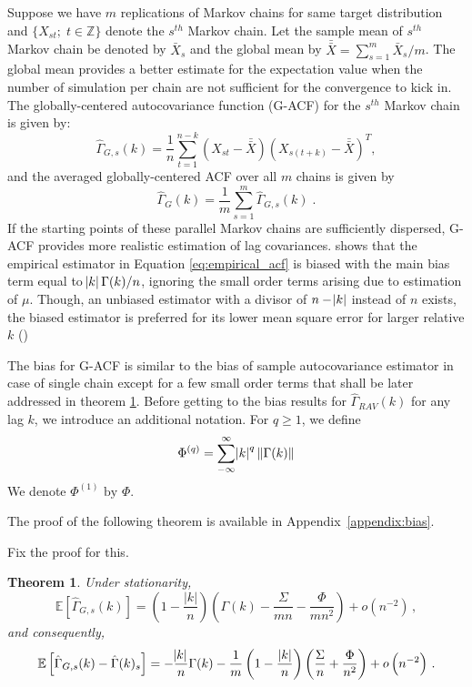 \documentclass[11pt]{article}
\newtheorem{theorem}{Theorem}
\theoremstyle{remark}
\begin{document}
 Suppose we have $m$ replications of Markov chains for same target distribution and $\{X_{st}; \; t \in \mathbb{Z}\}$ denote the $s^{th}$ Markov chain. Let the sample mean of $s^{th}$ Markov chain be denoted by $\bar{X}_s$ and the global mean by $\bar{\bar{X}} = \sum_{s = 1}^{m}\bar{X}_s/m$. The global mean provides a better estimate for the expectation value when the number of simulation per chain are not sufficient for the convergence to kick in. The globally-centered autocovariance function (G-ACF) for the $s^{th}$ Markov chain is given by:
%
\[
\hat{\Gamma}_{G,s}(k) = \dfrac{1}{n} \sum_{t=1}^{n-k}(X_{st}-\bar{\bar{X}})(X_{s(t+k)}-\bar{\bar{X}})^T,
\]
and the averaged globally-centered ACF over all $m$ chains is given by 
\[
\hat{\Gamma}_G(k) = \dfrac{1}{m}\sum_{s=1}^m \hat{\Gamma}_{G,s}(k)\;.
\]
If the starting points of these parallel Markov chains are sufficiently dispersed, G-ACF provides more realistic estimation of lag covariances. \cite{priestley1981spectral} shows that the empirical estimator in Equation \ref{eq:empirical_acf} is biased with the main bias term equal to $\abs{k}\Gamma(k)/n$, ignoring the small order terms arising due to estimation of $\mu$. Though, an unbiased estimator with a divisor of $n - \abs{k}$ instead of $n$ exists, the biased estimator is preferred for its lower mean square error for larger relative $k$  (\cite{priestley1981spectral})



The bias for G-ACF is similar to the bias of sample autocovariance estimator in case of single chain except for a few small order terms that shall be later addressed in theorem \ref{th:G-_expec}. Before getting to the bias results for $\hat{\Gamma}_{RAV}(k)$ for any lag $k$, we introduce an additional notation. For $q \geq 1$, we define
\[
\Phi^{(q)} = \sum\limits_{-\infty}^{\infty}\abs{k}^q \|\Gamma(k)\|
\]
We denote $\Phi^{(1)} \textrm{ by } \Phi$. 

The proof of the following theorem is available in Appendix~\ref{appendix:bias}.

{\color{blue} Fix the proof for this.}
\begin{theorem} \label{th:G-_expec} Under stationarity,
\[
   \mathbb{E} \left[\hat{\Gamma}_{G,s}(k) \right] = \left(1- \dfrac{|k|}{n}\right) \left(\Gamma(k) - \dfrac{\Sigma}{mn} - \dfrac{\Phi}{mn^2}\right)  + o \left(n^{-2} \right)\,,
\]
and consequently,
\[
\mathbb{E} \left[\hat{\Gamma}_{G,s}(k) - \hat{\Gamma}(k)_s \right] = -\dfrac{\abs{k}}{n}\Gamma(k) - \dfrac{1}{m}\left(1- \dfrac{|k|}{n}\right)\left(\dfrac{\Sigma}{n} + \dfrac{\Phi}{n^2}\right) + o\left(n^{-2} \right)\,. 
\]
\end{theorem}
\end{document}
